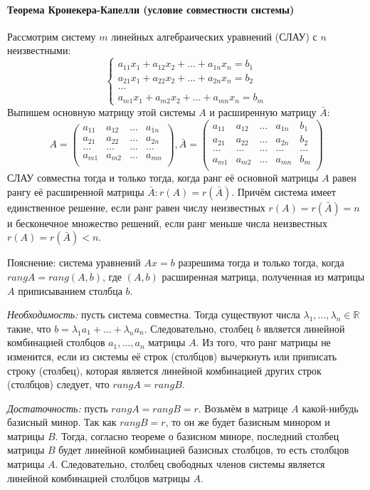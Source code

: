 \documentclass[a4paper,14pt]{article}
\begin{document}
\paragraph{Теорема Кронекера-Капелли (условие совместности системы)}
Рассмотрим систему $m$ линейных алгебраических уравнений (СЛАУ) с $n$ неизвестными:
\[
\begin{cases}
	a_{11}x_1 + a_{12}x_2 + ... + a_{1n}x_n = b_1 \\
	a_{21}x_1 + a_{22}x_2 + ... + a_{2n}x_n = b_2 \\
	... \\
	a_{m1}x_1 + a_{m2}x_2 + ... + a_{mn}x_n = b_m
\end{cases}
\]
\noindent Выпишем основную матрицу этой системы $A$ и расширенную матрицу $\bar A$:
\[
A=
\begin{pmatrix}
	a_{11} & a_{12} & ... & a_{1n} \\
	a_{21} & a_{22} & ... & a_{2n} \\
	... & ... & ... & ... \\
	a_{m1} & a_{m2} & ... & a_{mn} \\
\end{pmatrix},
\bar A =
\begin{pmatrix}
	a_{11} & a_{12} & ... & a_{1n} & b_1 \\
	a_{21} & a_{22} & ... & a_{2n} & b_2 \\
	... & ... & ... & ... & ... \\
	a_{m1} & a_{m2} & ... & a_{mn} & b_m \\
\end{pmatrix}
\]
\noindent СЛАУ совместна тогда и только тогда, когда ранг её основной матрицы $A$ равен рангу её расширенной матрицы $\bar A: r(A) = r(\bar A)$.
\noindent Причём система имеет единственное решение, если ранг равен числу неизвестных $r(A) = r(\bar A) = n$ и бесконечное множество решений, если ранг меньше числа неизвестных $r(A) = r(\bar A) < n$.
\begin{evidence}
	Пояснение: система уравнений $Ax=b$ разрешима тогда и только тогда, когда $rang A = rang (A, b)$, где $(A, b)$ расширенная матрица, полученная из матрицы $A$ приписыванием столбца $b$.
	
	\textit{Необходимость:} пусть система совместна. Тогда существуют числа $\lambda_1,...,\lambda_n \in \mathbb{R}$ такие, что $b = \lambda_1a_1 + ... + \lambda_na_n$. Следовательно, столбец $b$ является линейной комбинацией столбцов $a_1,...,a_n$ матрицы $A$. Из того, что ранг матрицы не изменится, если из системы её строк (столбцов) вычеркнуть или приписать строку (столбец), которая является линейной комбинацией других строк (столбцов) следует, что $rang A = rang B$.
	
	\textit{Достаточность:} пусть $rang A = rang B = r$. Возьмём в матрице $A$ какой-нибудь базисный минор. Так как $rang B = r$, то он же будет базисным минором и матрицы $B$. Тогда, согласно теореме о базисном миноре, последний столбец матрицы $B$ будет линейной комбинацией базисных столбцов, то есть столбцов матрицы $A$. Следовательно, столбец свободных членов системы является линейной комбинацией столбцов матрицы $A$.
\end{evidence}
\end{document}
